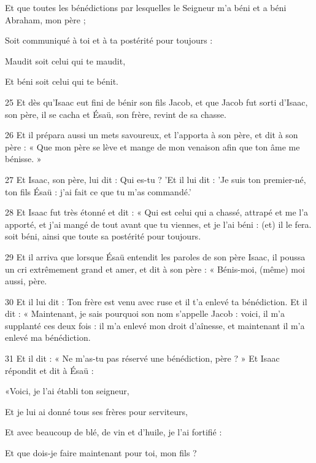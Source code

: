 \par    
\par     Et que toutes les bénédictions par lesquelles le Seigneur m'a béni et a béni Abraham, mon père ;  
\par     Soit communiqué à toi et à ta postérité pour toujours :
\par    
\par     Maudit soit celui qui te maudit,  
\par     Et béni soit celui qui te bénit.
\par    
\par 25 Et dès qu'Isaac eut fini de bénir son fils Jacob, et que Jacob fut sorti d'Isaac, son père, il se cacha et Ésaü, son frère, revint de sa chasse.
\par 26 Et il prépara aussi un mets savoureux, et l'apporta à son père, et dit à son père : « Que mon père se lève et mange de mon venaison afin que ton âme me bénisse. »
\par 27 Et Isaac, son père, lui dit : Qui es-tu ? 'Et il lui dit : 'Je suis ton premier-né, ton fils Ésaü : j'ai fait ce que tu m'as commandé.'
\par 28 Et Isaac fut très étonné et dit : « Qui est celui qui a chassé, attrapé et me l'a apporté, et j'ai mangé de tout avant que tu viennes, et je l'ai béni : (et) il le fera. soit béni, ainsi que toute sa postérité pour toujours.
\par 29 Et il arriva que lorsque Ésaü entendit les paroles de son père Isaac, il poussa un cri extrêmement grand et amer, et dit à son père : « Bénis-moi, (même) moi aussi, père.
\par 30 Et il lui dit : Ton frère est venu avec ruse et il t'a enlevé ta bénédiction. Et il dit : « Maintenant, je sais pourquoi son nom s'appelle Jacob : voici, il m'a supplanté ces deux fois : il m'a enlevé mon droit d'aînesse, et maintenant il m'a enlevé ma bénédiction.
\par 31 Et il dit : « Ne m'as-tu pas réservé une bénédiction, père ? » Et Isaac répondit et dit à Ésaü :
\par    
\par     «Voici, je l'ai établi ton seigneur,  
\par     Et je lui ai donné tous ses frères pour serviteurs,  
\par     Et avec beaucoup de blé, de vin et d'huile, je l'ai fortifié :
\par    
\par     Et que dois-je faire maintenant pour toi, mon fils ?
